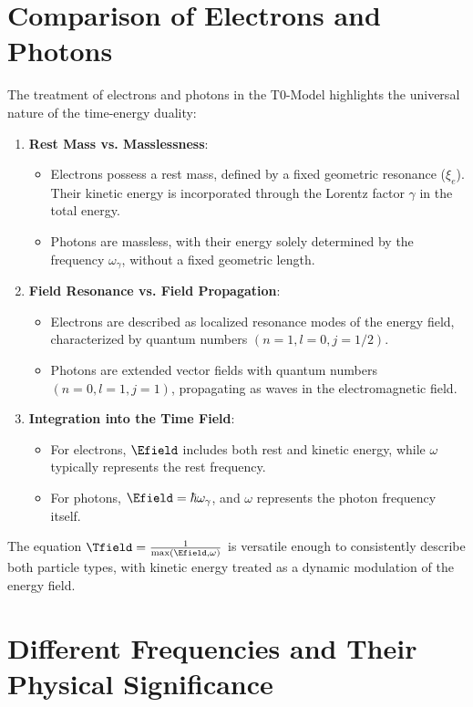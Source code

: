 \section{Comparison of Electrons and Photons}
\label{sec:comparison}

The treatment of electrons and photons in the T0-Model highlights the universal nature of the time-energy duality:

\begin{enumerate}
	\item \textbf{Rest Mass vs. Masslessness}:
	\begin{itemize}
		\item Electrons possess a rest mass, defined by a fixed geometric resonance (\(\xi_e\)). Their kinetic energy is incorporated through the Lorentz factor \(\gamma\) in the total energy.
		\item Photons are massless, with their energy solely determined by the frequency \(\omega_\gamma\), without a fixed geometric length.
	\end{itemize}
	
	\item \textbf{Field Resonance vs. Field Propagation}:
	\begin{itemize}
		\item Electrons are described as localized resonance modes of the energy field, characterized by quantum numbers \((n=1, l=0, j=1/2)\).
		\item Photons are extended vector fields with quantum numbers \((n=0, l=1, j=1)\), propagating as waves in the electromagnetic field.
	\end{itemize}
	
	\item \textbf{Integration into the Time Field}:
	\begin{itemize}
		\item For electrons, \( \Efield \) includes both rest and kinetic energy, while \(\omega\) typically represents the rest frequency.
		\item For photons, \( \Efield = \hbar \omega_\gamma \), and \(\omega\) represents the photon frequency itself.
	\end{itemize}
\end{enumerate}

The equation \( \Tfield = \frac{1}{\max(\Efield, \omega)} \) is versatile enough to consistently describe both particle types, with kinetic energy treated as a dynamic modulation of the energy field.

\section{Different Frequencies and Their Physical Significance}
\label{sec:frequencies}

